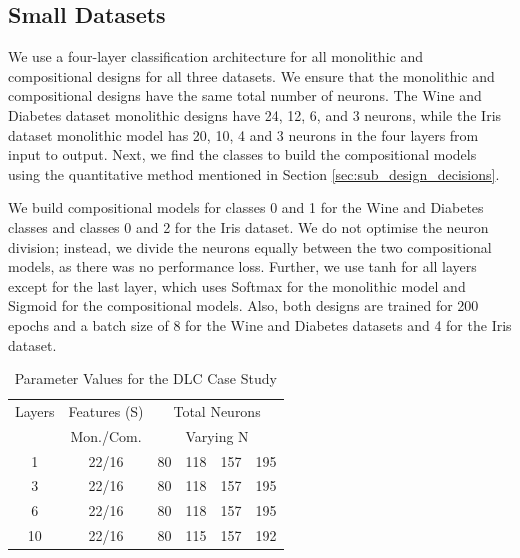 \subsection{Small Datasets}

We use a four-layer classification architecture for all monolithic and compositional designs for all three datasets. We ensure that the monolithic and compositional designs have the same total number of neurons. The Wine and Diabetes dataset monolithic designs have 24, 12, 6, and 3 neurons, while the Iris dataset monolithic model has 20, 10, 4 and 3 neurons in the four layers from input to output. Next, we find the classes to build the compositional models using the quantitative method mentioned in Section \ref{sec:sub_design_decisions}. 

We build compositional models for classes 0 and 1 for the Wine and Diabetes classes and classes 0 and 2 for the Iris dataset. We do not optimise the neuron division; instead, we divide the neurons equally between the two compositional models, as there was no performance loss. Further, we use \gls{tanh} for all layers except for the last layer, which uses Softmax for the monolithic model and Sigmoid for the compositional models. Also, both designs are trained for 200 epochs and a batch size of 8 for the Wine and Diabetes datasets and 4 for the Iris dataset.

\begin{table}
    \centering
    \caption{Parameter Values for the DLC Case Study}
    \begin{tabular}{cccccc}
    \hline
    Layers & Features (S) & \multicolumn{4}{c}{Total Neurons}\\
     & Mon./Com. &  \multicolumn{4}{c}{Varying N}\\
    \hline
    1 & 22/16 & 80 & 118 & 157 & 195\\
    3 & 22/16 & 80 & 118 & 157 & 195\\
    6 & 22/16 & 80 & 118 & 157 & 195\\
    10 & 22/16 & 80 & 115 & 157 & 192\\
    \hline
    \end{tabular}
    \label{tab:parameter_values}
\end{table}
  
